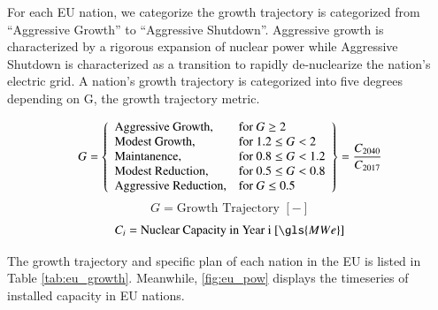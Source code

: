 For each \gls{EU} nation, we categorize the growth trajectory is categorized from
``Aggressive Growth'' to ``Aggressive Shutdown''. Aggressive growth is
characterized by a rigorous expansion of nuclear power while
Aggressive Shutdown is characterized as a transition to rapidly
de-nuclearize the nation's electric grid. A nation's growth trajectory is
categorized into five degrees depending on G, the growth trajectory metric.

 \[
 G = \left\{\begin{array}{ll}
 \text{Aggressive Growth}, & \text{for } G \geq 2\\
 \text{Modest Growth}, & \text{for } 1.2 \leq G < 2\\
 \text{Maintanence}, & \text{for } 0.8 \leq G < 1.2 \\
 \text{Modest Reduction}, & \text{for } 0.5 \leq G< 0.8\\
 \text{Aggressive Reduction}, & \text{for } G \leq 0.5
 \end{array}\right\} = \frac{C_{2040}}{C_{2017}}\\\\
 \]
 \[
  G = \text{Growth Trajectory  } [-] 
 \]
 \[
 C_{i} = \text{Nuclear Capacity in Year i  } [\gls{MWe}]
 \]

The growth trajectory and specific plan of each nation in the \gls{EU} 
is listed in Table \ref{tab:eu_growth}. Meanwhile, \cref{fig:eu_pow} displays the
timeseries of installed capacity in \gls{EU} nations.


